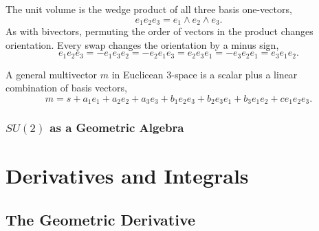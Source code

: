 \documentclass{book}
\begin{document}
	The unit volume is the wedge product of all three basis one-vectors,
	\[
	e_1e_2e_3 = e_1 \wedge e_2 \wedge e_3.  
	\]
	As with bivectors, permuting the order of vectors in the product changes orientation. Every swap changes the orientation by a minus sign,
	\[
	e_1e_2e_3 = -e_1e_3e_2 = -e_2e_1e_3 = e_2e_3e_1 = -e_3e_2e_1 = e_3e_1e_2.
	\]
	
	A general multivector $m$ in Euclicean 3-space is a scalar plus a linear combination of basis vectors,
	\[
	m = s + a_1e_1 + a_2e_2 + a_3e_3 + b_1e_2e_3 + b_2e_3e_1 + b_3e_1e_2 + ce_1e_2e_3.
	\] 
	\subsection{$SU(2)$ as a Geometric Algebra}
	
	\chapter{Derivatives and Integrals}
	\section{The Geometric Derivative}
	
	
\end{document}
